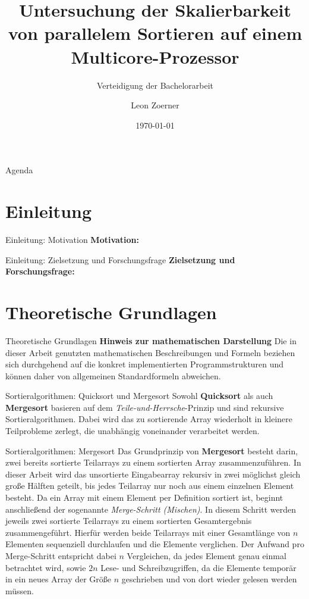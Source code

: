 \documentclass[10pt, ngerman]{beamer}
\title[Skalierbarkeit paralleles Sortieren]{Untersuchung der Skalierbarkeit von parallelem Sortieren auf einem Multicore-Prozessor}
\subtitle{Verteidigung der Bachelorarbeit}
\author{Leon Zoerner}
\institute{Informatik}
\date{\today}
\begin{document}
\begin{frame}
    \titlepage
\end{frame}

\begin{frame}{Agenda}
    \tableofcontents
\end{frame}

\section{Einleitung}
\begin{frame}{Einleitung: Motivation}
    \textbf{Motivation:}
    \Motivation
\end{frame}

\begin{frame}{Einleitung: Zielsetzung und Forschungsfrage}
    \textbf{Zielsetzung und Forschungsfrage:}
    \ZielsetzungUndForschungsfrage
\end{frame}

\section{Theoretische Grundlagen}
\begin{frame}{Theoretische Grundlagen}
    \textbf{Hinweis zur mathematischen Darstellung}
    Die in dieser Arbeit genutzten mathematischen Beschreibungen und Formeln beziehen sich durchgehend auf die konkret implementierten Programmstrukturen und können daher von allgemeinen Standardformeln abweichen.
\end{frame}

\begin{frame}{Sortieralgorithmen: Quicksort und Mergesort}
    Sowohl \textbf{Quicksort} als auch \textbf{Mergesort} basieren auf dem \emph{Teile-und-Herrsche}-Prinzip und sind rekursive Sortieralgorithmen. Dabei wird das zu sortierende Array wiederholt in kleinere Teilprobleme zerlegt, die unabhängig voneinander verarbeitet werden.
\end{frame}

\begin{frame}{Sortieralgorithmen: Mergesort}
    Das Grundprinzip von \textbf{Mergesort} besteht darin, zwei bereits sortierte Teilarrays zu einem sortierten Array zusammenzuführen. In dieser Arbeit wird das unsortierte Eingabearray rekursiv in zwei möglichst gleich große Hälften geteilt, bis jedes Teilarray nur noch aus einem einzelnen Element besteht. Da ein Array mit einem Element per Definition sortiert ist, beginnt anschließend der sogenannte \emph{Merge-Schritt (Mischen)}. In diesem Schritt werden jeweils zwei sortierte Teilarrays zu einem sortierten Gesamtergebnis zusammengeführt.
    \newline
    Hierfür werden beide Teilarrays mit einer Gesamtlänge von \(n\) Elementen sequenziell durchlaufen und die Elemente verglichen.
    Der Aufwand pro Merge-Schritt entspricht dabei \(n\) Vergleichen, da jedes Element genau einmal betrachtet wird, sowie \(2n\) Lese- und Schreibzugriffen, da die Elemente temporär in ein neues Array der Größe \(n\) geschrieben und von dort wieder gelesen werden müssen.
\end{frame}
\end{document}
